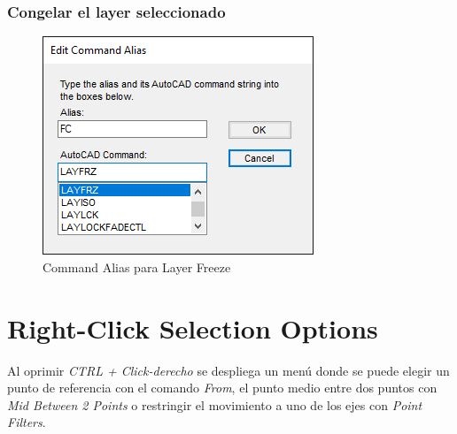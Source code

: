 \documentclass[12pt,letterpaper,final]{report}
\begin{document}
\subsection{Congelar el layer seleccionado}

\begin{figure}[H]
	\centering
	\includegraphics[width=0.55\linewidth, height=0.45\textheight,keepaspectratio]{Imagenes/autocad_alias_layeroptions_04}
	\caption{Command Alias para Layer Freeze}
	\label{fig:autocadaliaslayeroptions04}
\end{figure}


\chapter{Right-Click Selection Options}

Al oprimir \emph{CTRL + Click-derecho} se despliega un menú donde se puede elegir un punto de referencia con el comando \emph{From}, el punto medio entre dos puntos con \emph{Mid Between 2 Points} o restringir el movimiento a uno de los ejes con \emph{Point Filters}.
\end{document}
